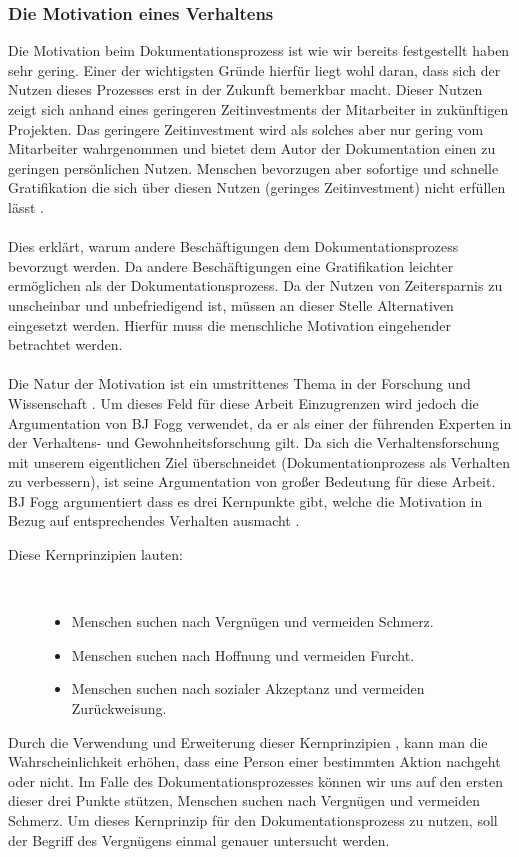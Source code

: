 \documentclass[a4paper,12pt]{scrartcl}
\begin{document}
\subsubsection{Die Motivation eines Verhaltens}
Die Motivation beim Dokumentationsprozess ist wie wir bereits festgestellt haben sehr gering. Einer der wichtigsten Gründe hierfür liegt wohl daran, dass sich der Nutzen dieses Prozesses erst in der Zukunft bemerkbar macht. Dieser Nutzen zeigt sich anhand eines geringeren Zeitinvestments der Mitarbeiter in zukünftigen Projekten. Das geringere Zeitinvestment wird als solches aber nur gering vom Mitarbeiter wahrgenommen und bietet dem Autor der Dokumentation einen zu geringen persönlichen Nutzen. Menschen bevorzugen aber sofortige und schnelle Gratifikation die sich über diesen Nutzen (geringes Zeitinvestment) nicht erfüllen lässt \cite{Kuhl2009}.
\\\\
Dies erklärt, warum andere Beschäftigungen dem Dokumentationsprozess bevorzugt werden. Da andere Beschäftigungen eine Gratifikation leichter ermöglichen als der Dokumentationsprozess. Da der Nutzen von Zeitersparnis zu unscheinbar und unbefriedigend ist, müssen an dieser Stelle Alternativen eingesetzt werden. Hierfür muss die menschliche Motivation eingehender betrachtet werden.
\\\\
Die Natur der Motivation ist ein umstrittenes Thema in der Forschung und Wissenschaft \cite{Eyal2014}. Um dieses Feld für diese Arbeit Einzugrenzen wird jedoch die Argumentation von BJ Fogg verwendet, da er als einer der führenden Experten in der Verhaltens- und Gewohnheitsforschung gilt. Da sich die Verhaltensforschung mit unserem eigentlichen Ziel überschneidet (Dokumentationprozess als Verhalten zu verbessern), ist seine Argumentation von großer Bedeutung für diese Arbeit. BJ Fogg argumentiert dass es drei Kernpunkte gibt, welche die Motivation in Bezug auf entsprechendes Verhalten ausmacht \cite{Eyal2014}. 
\begin{description}
   \item[Diese Kernprinzipien lauten:]~\par
   \begin{itemize}
      \item Menschen suchen nach Vergnügen und vermeiden Schmerz.
      \item Menschen suchen nach Hoffnung und vermeiden Furcht.
      \item Menschen suchen nach sozialer Akzeptanz und vermeiden Zurückweisung.
   \end{itemize}
\end{description}
Durch die Verwendung und Erweiterung dieser Kernprinzipien \cite{Eyal2014}, kann man die Wahrscheinlichkeit erhöhen, dass eine Person einer bestimmten Aktion nachgeht oder nicht. Im Falle des Dokumentationsprozesses können wir uns auf den ersten dieser drei Punkte stützen, Menschen suchen nach Vergnügen und vermeiden Schmerz. Um dieses Kernprinzip für den Dokumentationsprozess zu nutzen, soll der Begriff des Vergnügens einmal genauer untersucht werden.
\end{document}
